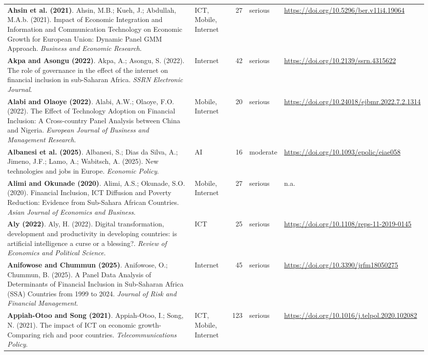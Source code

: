 {\begin{longtable}{@{}p{7.4cm} p{1.3cm} r l p{3.4cm}@{}}
\textbf{Ahsin et al. (2021)}. Ahsin, M.B.; Kueh, J.; Abdullah, M.A.b. (2021). Impact of Economic Integration and Information and Communication Technology on Economic Growth for European Union: Dynamic Panel GMM Approach. \emph{Business and Economic Research}. & ICT, Mobile, Internet & 27 & serious & \url{https://doi.org/10.5296/ber.v11i4.19064} \\
\textbf{Akpa and Asongu (2022)}. Akpa, A.; Asongu, S. (2022). The role of governance in the effect of the internet on financial inclusion in sub-Saharan Africa. \emph{SSRN Electronic Journal}. & Internet & 42 & serious & \url{https://doi.org/10.2139/ssrn.4315622} \\
\textbf{Alabi and Olaoye (2022)}. Alabi, A.W.; Olaoye, F.O. (2022). The Effect of Technology Adoption on  Financial Inclusion: A Cross-country Panel Analysis between China and Nigeria. \emph{European Journal of Business and Management Research}. & Mobile, Internet & 20 & serious & \url{https://doi.org/10.24018/ejbmr.2022.7.2.1314} \\
\textbf{Albanesi et al. (2025)}. Albanesi, S.; Dias da Silva, A.; Jimeno, J.F.; Lamo, A.; Wabitsch, A. (2025). New technologies and jobs in Europe. \emph{Economic Policy}. & AI & 16 & moderate & \url{https://doi.org/10.1093/epolic/eiae058} \\
\textbf{Alimi and Okunade (2020)}. Alimi, A.S.; Okunade, S.O. (2020). Financial Inclusion, ICT Diffusion and Poverty Reduction: Evidence from Sub-Sahara African Countries. \emph{Asian Journal of Economics and Business}. & Mobile, Internet & 27 & serious & n.a. \\
\textbf{Aly (2022)}. Aly, H. (2022). Digital transformation, development and productivity in developing countries: is artificial intelligence a curse or a blessing?. \emph{Review of Economics and Political Science}. & ICT & 25 & serious & \url{https://doi.org/10.1108/reps-11-2019-0145} \\
\textbf{Anifowose and Chummun (2025)}. Anifowose, O.; Chummun, B. (2025). A Panel Data Analysis of Determinants of Financial Inclusion in Sub-Saharan Africa (SSA) Countries from 1999 to 2024. \emph{Journal of Risk and Financial Management}. & Internet & 45 & serious & \url{https://doi.org/10.3390/jrfm18050275} \\
\textbf{Appiah-Otoo and Song (2021)}. Appiah-Otoo, I.; Song, N. (2021). The impact of ICT on economic growth-Comparing rich and poor countries. \emph{Telecommunications Policy}. & ICT, Mobile, Internet & 123 & serious & \url{https://doi.org/10.1016/j.telpol.2020.102082} \\

\end{longtable}}
